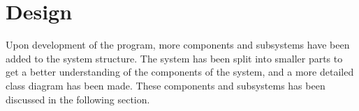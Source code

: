 \chapter{Design} \label{ch:architectural_design}
Upon development of the program, more components and subsystems have been added to the system structure. The system has been split into smaller parts to get a better understanding of the components of the system, and a more detailed class diagram has been made. These components and subsystems has been discussed in the following section.
